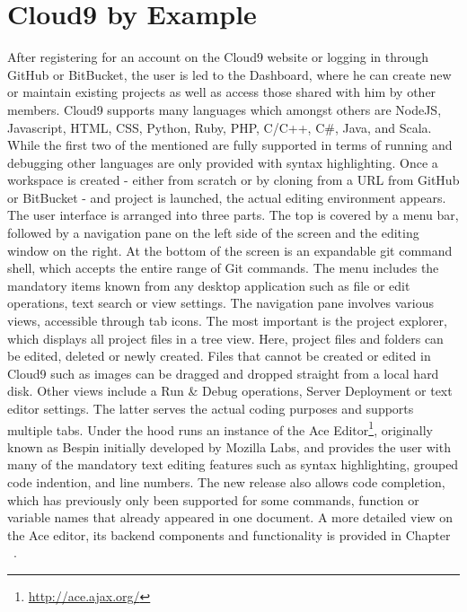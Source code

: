 \section{Cloud9 by Example}
\label{sec:Motivation}


After registering for an account on the Cloud9 website or logging in through GitHub or BitBucket, the user is led to the Dashboard, where he can create new or maintain existing projects as well as access those shared with him by other members. Cloud9 supports many languages which amongst others are NodeJS, Javascript, HTML, CSS, Python, Ruby, PHP, C/C++, C\#, Java, and Scala. While the first two of the mentioned are fully supported in terms of running and debugging other languages are only provided with syntax highlighting. Once a workspace is created - either from scratch or by cloning from a URL from GitHub or BitBucket - and project is launched, the actual editing environment appears. The user interface is arranged into three parts. The top is covered by a menu bar, followed by a navigation pane on the left side of the screen and the editing window on the right. At the bottom of the screen is an expandable git command shell, which accepts the entire range of Git commands. The menu includes the mandatory items known from any desktop application such as file or edit operations, text search or view settings. The navigation pane involves various views, accessible through tab icons. The most important is the project explorer, which displays all project files in a tree view. Here, project files and folders can be edited, deleted or newly created. Files that cannot be created or edited in Cloud9 such as images can be dragged and dropped straight from a local hard disk. Other views include a Run \& Debug operations, Server Deployment or text editor settings. The latter serves the actual coding purposes and supports multiple tabs. Under the hood runs an instance of the Ace Editor\footnote{\url{http://ace.ajax.org/}}, originally known as Bespin initially developed by Mozilla Labs, and provides the user with many of the mandatory text editing features such as syntax highlighting, grouped code indention, and line numbers. The new release also allows code completion, which has previously only been supported for some commands, function or variable names that already appeared in one document. A more detailed view on the Ace editor, its backend components and functionality is provided in Chapter ~\needcite. 

